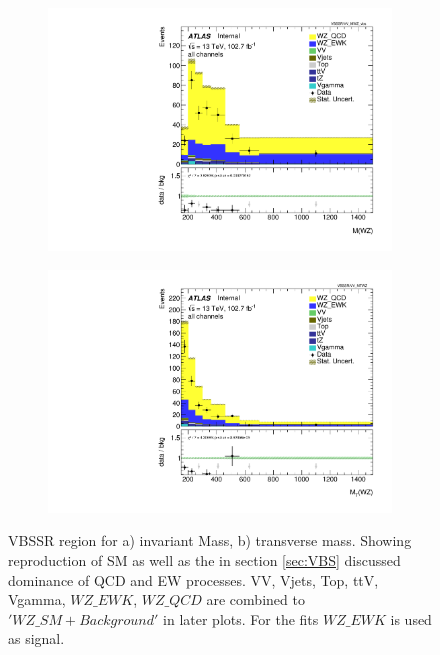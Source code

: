 \documentclass[../Bachelorarbeit.tex]{subfiles}
\begin{document}
\begin{figure}[h]
    \centering
    \begin{subfigure}{0.45\textwidth}
        \centering
        \includegraphics[width=\textwidth]{Plots/SM_reproduction/all_VV_MWZ_vbs.pdf}
        \caption{}
    \end{subfigure}
    \begin{subfigure}{0.45\textwidth}
        \centering
        \includegraphics[width=\textwidth]{Plots/SM_reproduction/all_VV_MTWZ.pdf}
        \caption{}
    \end{subfigure}
    \caption{VBSSR region for a) invariant Mass, b) transverse mass. Showing reproduction of SM as well as the in section \ref{sec:VBS} discussed dominance of QCD and EW processes. VV, Vjets, Top, ttV, Vgamma, $WZ\_EWK$, $WZ\_QCD$ are combined to $'WZ\_SM + Background'$ in later plots. For the fits $WZ\_EWK$ is used as signal.}
    \label{fig:SM_re}
\end{figure}
\end{document}
